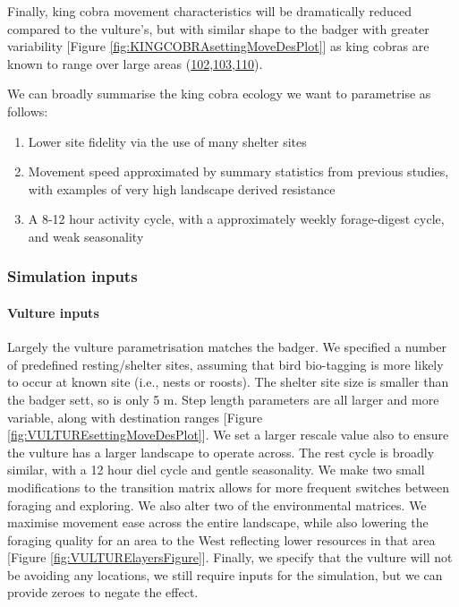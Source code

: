 \documentclass[10pt,a4paper]{article}
\begin{document}
Finally, king cobra movement characteristics will be dramatically reduced compared to the vulture's, but with similar shape to the badger with greater variability {[}Figure \ref{fig:KINGCOBRAsettingMoveDesPlot}{]} as king cobras are known to range over large areas (\protect\hyperlink{ref-Marshall2018}{102},\protect\hyperlink{ref-marshall_no_2020}{103},\protect\hyperlink{ref-Silva2018}{110}).

We can broadly summarise the king cobra ecology we want to parametrise as follows:

\begin{enumerate}
\def\labelenumi{\arabic{enumi}.}
\item
  Lower site fidelity via the use of many shelter sites
\item
  Movement speed approximated by summary statistics from previous studies, with examples of very high landscape derived resistance
\item
  A 8-12 hour activity cycle, with a approximately weekly forage-digest cycle, and weak seasonality
\end{enumerate}

\hypertarget{simulation-inputs}{%
\subsubsection{Simulation inputs}\label{simulation-inputs}}

\hypertarget{vulture-inputs}{%
\paragraph{Vulture inputs}\label{vulture-inputs}}

Largely the vulture parametrisation matches the badger.
We specified a number of predefined resting/shelter sites, assuming that bird bio-tagging is more likely to occur at known site (i.e., nests or roosts).
The shelter site size is smaller than the badger sett, so is only 5 m.
Step length parameters are all larger and more variable, along with destination ranges {[}Figure \ref{fig:VULTUREsettingMoveDesPlot}{]}.
We set a larger rescale value also to ensure the vulture has a larger landscape to operate across.
The rest cycle is broadly similar, with a 12 hour diel cycle and gentle seasonality.
We make two small modifications to the transition matrix allows for more frequent switches between foraging and exploring.
We also alter two of the environmental matrices.
We maximise movement ease across the entire landscape, while also lowering the foraging quality for an area to the West reflecting lower resources in that area {[}Figure \ref{fig:VULTURElayersFigure}{]}.
Finally, we specify that the vulture will not be avoiding any locations, we still require inputs for the simulation, but we can provide zeroes to negate the effect.
\end{document}
